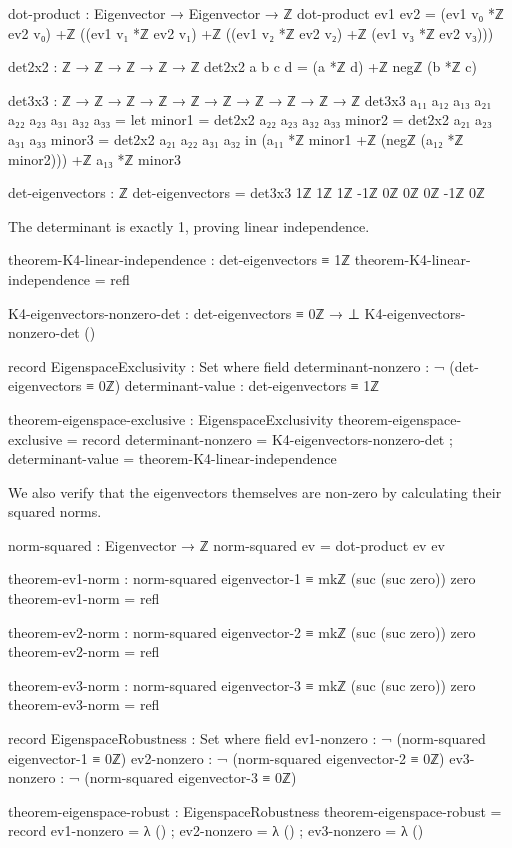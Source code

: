 \documentclass[11pt,a4paper]{book}
\begin{document}
\begin{code}
dot-product : Eigenvector → Eigenvector → ℤ
dot-product ev1 ev2 = 
  (ev1 v₀ *ℤ ev2 v₀) +ℤ ((ev1 v₁ *ℤ ev2 v₁) +ℤ ((ev1 v₂ *ℤ ev2 v₂) +ℤ (ev1 v₃ *ℤ ev2 v₃)))

det2x2 : ℤ → ℤ → ℤ → ℤ → ℤ
det2x2 a b c d = (a *ℤ d) +ℤ negℤ (b *ℤ c)

det3x3 : ℤ → ℤ → ℤ → ℤ → ℤ → ℤ → ℤ → ℤ → ℤ → ℤ
det3x3 a₁₁ a₁₂ a₁₃ a₂₁ a₂₂ a₂₃ a₃₁ a₃₂ a₃₃ =
  let minor1 = det2x2 a₂₂ a₂₃ a₃₂ a₃₃
      minor2 = det2x2 a₂₁ a₂₃ a₃₁ a₃₃
      minor3 = det2x2 a₂₁ a₂₂ a₃₁ a₃₂
  in (a₁₁ *ℤ minor1 +ℤ (negℤ (a₁₂ *ℤ minor2))) +ℤ a₁₃ *ℤ minor3

det-eigenvectors : ℤ
det-eigenvectors = det3x3 
  1ℤ 1ℤ 1ℤ
  -1ℤ 0ℤ 0ℤ
  0ℤ -1ℤ 0ℤ
\end{code}

The determinant is exactly 1, proving linear independence.

\begin{code}
theorem-K4-linear-independence : det-eigenvectors ≡ 1ℤ
theorem-K4-linear-independence = refl

K4-eigenvectors-nonzero-det : det-eigenvectors ≡ 0ℤ → ⊥
K4-eigenvectors-nonzero-det ()

record EigenspaceExclusivity : Set where
  field
    determinant-nonzero : ¬ (det-eigenvectors ≡ 0ℤ)
    determinant-value   : det-eigenvectors ≡ 1ℤ

theorem-eigenspace-exclusive : EigenspaceExclusivity
theorem-eigenspace-exclusive = record
  { determinant-nonzero = K4-eigenvectors-nonzero-det
  ; determinant-value = theorem-K4-linear-independence
  }

\end{code}

We also verify that the eigenvectors themselves are non-zero by calculating their squared norms.

\begin{code}
norm-squared : Eigenvector → ℤ
norm-squared ev = dot-product ev ev

theorem-ev1-norm : norm-squared eigenvector-1 ≡ mkℤ (suc (suc zero)) zero
theorem-ev1-norm = refl

theorem-ev2-norm : norm-squared eigenvector-2 ≡ mkℤ (suc (suc zero)) zero
theorem-ev2-norm = refl

theorem-ev3-norm : norm-squared eigenvector-3 ≡ mkℤ (suc (suc zero)) zero
theorem-ev3-norm = refl

record EigenspaceRobustness : Set where
  field
    ev1-nonzero : ¬ (norm-squared eigenvector-1 ≡ 0ℤ)
    ev2-nonzero : ¬ (norm-squared eigenvector-2 ≡ 0ℤ)
    ev3-nonzero : ¬ (norm-squared eigenvector-3 ≡ 0ℤ)

theorem-eigenspace-robust : EigenspaceRobustness
theorem-eigenspace-robust = record
  { ev1-nonzero = λ ()
  ; ev2-nonzero = λ ()
  ; ev3-nonzero = λ ()
  }

\end{code}
\end{document}
